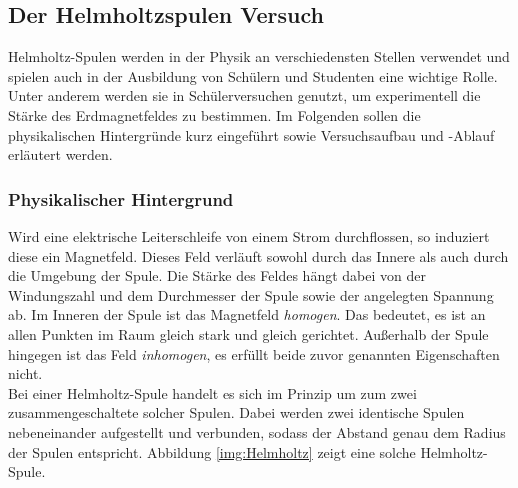 \subsection{Der Helmholtzspulen Versuch}

Helmholtz-Spulen werden in der Physik an verschiedensten Stellen verwendet und spielen auch in der Ausbildung von Schülern und Studenten eine wichtige Rolle. Unter anderem werden sie in Schülerversuchen genutzt, um experimentell die Stärke des Erdmagnetfeldes zu bestimmen. Im Folgenden sollen die physikalischen Hintergründe kurz eingeführt sowie Versuchsaufbau und -Ablauf erläutert werden.

\subsubsection{Physikalischer Hintergrund}
Wird eine elektrische Leiterschleife von einem Strom durchflossen, so induziert diese ein Magnetfeld. Dieses Feld verläuft sowohl durch das Innere als auch durch die Umgebung der Spule. Die Stärke des Feldes hängt dabei von der Windungszahl und dem Durchmesser der Spule sowie der angelegten Spannung ab.
Im Inneren der Spule ist das Magnetfeld \textit{homogen}. Das bedeutet, es ist an allen Punkten im Raum gleich stark und gleich gerichtet. Außerhalb der Spule hingegen ist das Feld \textit{inhomogen}, es erfüllt beide zuvor genannten Eigenschaften nicht.\\

Bei einer Helmholtz-Spule handelt es sich im Prinzip um zum zwei zusammengeschaltete solcher Spulen. Dabei werden zwei identische Spulen nebeneinander aufgestellt und verbunden, sodass der Abstand genau dem Radius der Spulen entspricht. Abbildung \ref{img:Helmholtz} zeigt eine solche Helmholtz-Spule.\\

